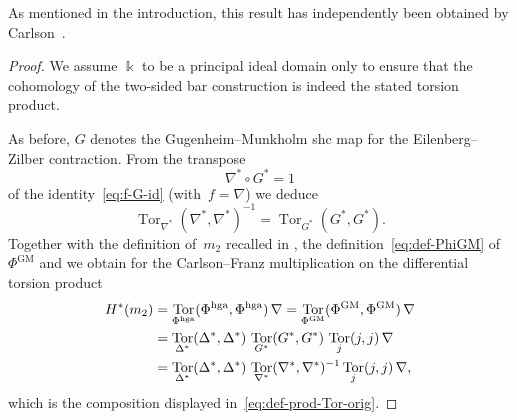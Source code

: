 \documentclass[letterpaper]{amsart}
\numberwithin{equation}{section}
\theoremstyle{plain}
\theoremstyle{definition}
\theoremstyle{remark}
\DeclareMathOperator{\Tor}{Tor}
\def\kk{\Bbbk}
\let\shuffle\nabla
\def\PhiGM{\Phi^{\mathrm{GM}}}
\def\Phihga{\Phi^{\mathrm{hga}}}
\begin{document}
As mentioned in the introduction, this result has independently been obtained by Carlson~\cite{Carlson:product}.

\begin{proof}
  We assume $\kk$ to be a principal ideal domain only to ensure that the cohomology
  of the two-sided bar construction is indeed the stated torsion product.
  
  As before, $G$ denotes the Gugenheim--Munkholm shc map for the Eilenberg--Zilber contraction.
  From the transpose
  \begin{equation}
    \shuffle^{*} \circ G^{*} = 1 %
  \end{equation}
  of the identity~\eqref{eq:f-G-id} (with~$f=\shuffle$) we deduce
  \begin{equation}
    \Tor_{\shuffle^{*}}(\shuffle^{*},\shuffle^{*})^{-1} = \Tor_{G^{*}}(G^{*},G^{*}). %
  \end{equation}
  Together with the definition of~$m_{2}$ recalled in ,
  the definition~\eqref{eq:def-PhiGM} of~$\PhiGM$ and  %
  we obtain for the Carlson--Franz multiplication on the differential torsion product
  \begin{align}
    H^{*}(m_{2}) &= \Tor_{\Phihga}(\Phihga,\Phihga)\,\shuffle
    = \Tor_{\PhiGM}(\PhiGM,\PhiGM)\,\shuffle \\
    \notag &= \Tor_{\Delta^{*}}(\Delta^{*},\Delta^{*})\,\Tor_{G^{*}}(G^{*},G^{*})\,\Tor_{j}(j,j)\,\shuffle \\
    \notag &= \Tor_{\Delta^{*}}(\Delta^{*},\Delta^{*})\,\Tor_{\shuffle^{*}}(\shuffle^{*},\shuffle^{*})^{-1}\Tor_{j}(j,j)\,\shuffle,
  \end{align}
  which is the composition displayed in~\eqref{eq:def-prod-Tor-orig}.
\end{proof}
\end{document}

